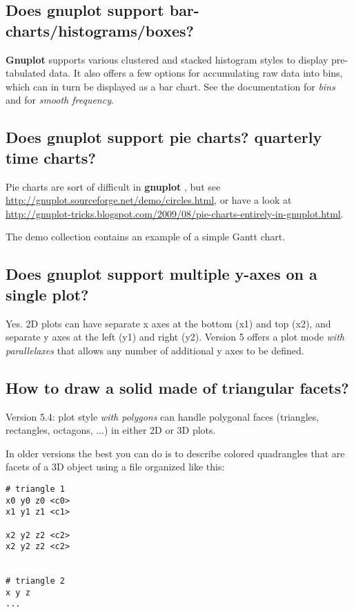 \documentclass[letter,11pt]{article}
\def\http#1{{\small\href{http://#1}{\url{http://#1}}}}
\newcommand{\http}[1]%
            {\htmladdnormallink{\latex{\url{http://#1}}%
                    \html{\textit{http://#1}}}%
                {http://#1}%
            }
\newcommand{\gnuplot}{\textbf{gnuplot }}
\newcommand{\Gnuplot}{\textbf{Gnuplot }}
\begin{document}
{\subsection{Does \gnuplot support bar-charts/histograms/boxes?}

\Gnuplot{} supports various clustered and stacked histogram styles to display
pre-tabulated data.  It also offers a few options for accumulating raw data
into bins, which can in turn be displayed as a bar chart.  See the documentation
for \textit{bins} and for \textit{smooth frequency}.

\subsection{Does \gnuplot support pie charts? quarterly time charts?}

Pie charts are sort of difficult in \gnuplot, but see
\http{gnuplot.sourceforge.net/demo/circles.html},
or have a look at
\http{gnuplot-tricks.blogspot.com/2009/08/pie-charts-entirely-in-gnuplot.html}.

The demo collection contains an example of a simple Gantt chart.

\subsection{Does \gnuplot support multiple y-axes on a single plot?}

Yes. 2D plots can have separate x axes at the bottom (x1) and top (x2),
and separate y axes at the left (y1) and right (y2).  Version 5 offers a
plot mode \textit{with parallelaxes} that allows any number of additional
y axes to be defined.

\subsection{How to draw a solid made of triangular facets?}

Version 5.4: plot style \textit{with polygons} can handle polygonal faces
(triangles, rectangles, octagons, ...) in either 2D or 3D plots.

In older versions the best you can do is to describe colored quadrangles
that are facets of a 3D object using a file organized like this:
\small
\begin{verbatim}
# triangle 1
x0 y0 z0 <c0>
x1 y1 z1 <c1>

x2 y2 z2 <c2>
x2 y2 z2 <c2>


# triangle 2
x y z
...
\end{verbatim}
\normalsize

}
\end{document}

